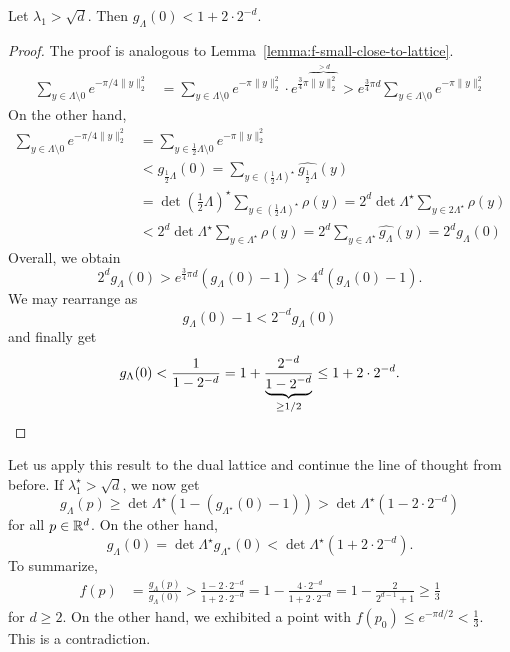 \begin{lemma}
  Let $\lambda_1 > \sqrt{d}$. Then $g_\Lambda(0) < 1 + 2 \cdot 2^{-d}$.
\end{lemma}
\begin{proof}
  The proof is analogous to Lemma~\ref{lemma:f-small-close-to-lattice}.
  \begin{align*}
   \sum_{y \in \Lambda \setminus 0} e^{-\pi/4 \|y\|_2^2}
      &= \sum_{y \in \Lambda \setminus 0} e^{-\pi \|y\|_2^2} \cdot e^{\frac{3}{4} \pi \overbrace{\|y\|_2^2}^{>d}}
      > e^{\frac{3}{4} \pi d} \sum_{y \in \Lambda \setminus 0} e^{-\pi \|y\|_2^2}
  \end{align*}
  On the other hand,
  \begin{align*}
    \sum_{y \in \Lambda \setminus 0} e^{-\pi/4 \|y\|_2^2}
      &= \sum_{y \in \frac{1}{2} \Lambda \setminus 0} e^{-\pi \|y\|_2^2}
 \\ & < g_{\frac{1}{2} \Lambda}(0)
      = \sum_{y \in (\frac{1}{2} \Lambda)^\star} \widehat{g_{\frac{1}{2} \Lambda}}(y)
 \\ & = \det(\frac{1}{2} \Lambda)^\star \sum_{y \in (\frac{1}{2} \Lambda)^\star} \rho(y)
      = 2^d \det \Lambda^\star \sum_{y \in 2\Lambda^\star} \rho(y)
 \\ & < 2^d \det \Lambda^\star \sum_{y \in \Lambda^\star} \rho(y)
      = 2^d \sum_{y \in \Lambda^\star} \widehat{g_\Lambda}(y)
      = 2^d g_\Lambda(0)
  \end{align*}
  Overall, we obtain
  \[
    2^d g_\Lambda(0) > e^{\frac{3}{4}\pi d} (g_\Lambda(0) - 1) > 4^d (g_\Lambda(0) - 1).
  \]
  We may rearrange as
  \[
    g_\Lambda(0) - 1 < 2^{-d} g_\Lambda(0)
  \]
  and finally get
  \[
    g_\Lambda(0) < \frac{1}{1 - 2^{-d}}
    = 1 + \frac{2^{-d}}{\underbrace{1 - 2^{-d}}_{\geq 1/2}} \leq 1 + 2 \cdot 2^{-d}.
    \qedhere
  \]
\end{proof}

Let us apply this result to the dual lattice and continue the line of thought from before.
If $\lambda_1^\star > \sqrt{d}$,
we now get
\[
  g_\Lambda(p) \geq \det \Lambda^\star (1 - (g_{\Lambda^\star}(0) - 1)) > \det \Lambda^\star (1 - 2 \cdot 2^{-d})
\]
for all $p \in \mathbb{R}^d$.
On the other hand,
\[
  g_\Lambda(0) = \det \Lambda^\star g_{\Lambda^\star}(0) < \det\Lambda^\star (1 + 2 \cdot 2^{-d}).
\]
To summarize,
\begin{align*}
  f(p) &= \frac{g_\Lambda(p)}{g_\Lambda(0)}
     > \frac{1 - 2 \cdot 2^{-d}}{1+2\cdot 2^{-d}}
     = 1 - \frac{4 \cdot 2^{-d}}{1 + 2 \cdot 2^{-d}}
     = 1 - \frac{2}{2^{d - 1} + 1} \geq \frac{1}{3}
\end{align*}
for $d \geq 2$.
On the other hand,
we exhibited a point with $f(p_0) \leq e^{-\pi d/2} < \frac{1}{3}$.
This is a contradiction.

